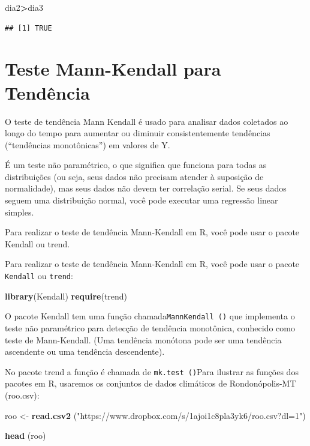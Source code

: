 \documentclass[
]{book}
\newenvironment{Shaded}{\begin{snugshade}}{\end{snugshade}}
\newcommand{\KeywordTok}[1]{\textcolor[rgb]{0.13,0.29,0.53}{\textbf{#1}}}
\newcommand{\NormalTok}[1]{#1}
\newcommand{\OperatorTok}[1]{\textcolor[rgb]{0.81,0.36,0.00}{\textbf{#1}}}
\newcommand{\StringTok}[1]{\textcolor[rgb]{0.31,0.60,0.02}{#1}}
\begin{document}
\begin{Shaded}
\begin{Highlighting}[]
\NormalTok{dia2}\OperatorTok{>}\NormalTok{dia3}
\end{Highlighting}
\end{Shaded}

\begin{verbatim}
## [1] TRUE
\end{verbatim}

\hypertarget{teste-mann-kendall-para-tenduxeancia}{%
\section{Teste Mann-Kendall para Tendência}\label{teste-mann-kendall-para-tenduxeancia}}

O teste de tendência Mann Kendall é usado para analisar dados coletados ao longo do tempo para aumentar ou diminuir consistentemente tendências (``tendências monotônicas'') em valores de Y.

É um teste não paramétrico, o que significa que funciona para todas as distribuições (ou seja, seus dados não precisam atender à suposição de normalidade), mas seus dados não devem ter correlação serial. Se seus dados seguem uma distribuição normal, você pode executar uma regressão linear simples.

Para realizar o teste de tendência Mann-Kendall em R, você pode usar o pacote Kendall ou trend.

Para realizar o teste de tendência Mann-Kendall em R, você pode usar o pacote \texttt{Kendall} ou \texttt{trend}:

\begin{Shaded}
\begin{Highlighting}[]
\KeywordTok{library}\NormalTok{(Kendall)}
\KeywordTok{require}\NormalTok{(trend)}
\end{Highlighting}
\end{Shaded}

O pacote Kendall tem uma função chamada\texttt{MannKendall\ ()} que implementa o teste não paramétrico para detecção de tendência monotônica, conhecido como teste de Mann-Kendall. (Uma tendência monótona pode ser uma tendência ascendente ou uma tendência descendente).

No pacote trend a função é chamada de \texttt{mk.test\ ()}Para ilustrar as funções dos pacotes em R, usaremos os conjuntos de dados climáticos de Rondonópolis-MT (roo.csv):

\begin{Shaded}
\begin{Highlighting}[]
\NormalTok{roo <-}\StringTok{ }\KeywordTok{read.csv2}\NormalTok{ (}\StringTok{"https://www.dropbox.com/s/1ajoi1c8pla3yk6/roo.csv?dl=1"}\NormalTok{)}

\KeywordTok{head}\NormalTok{ (roo)}
\end{Highlighting}
\end{Shaded}
\end{document}
